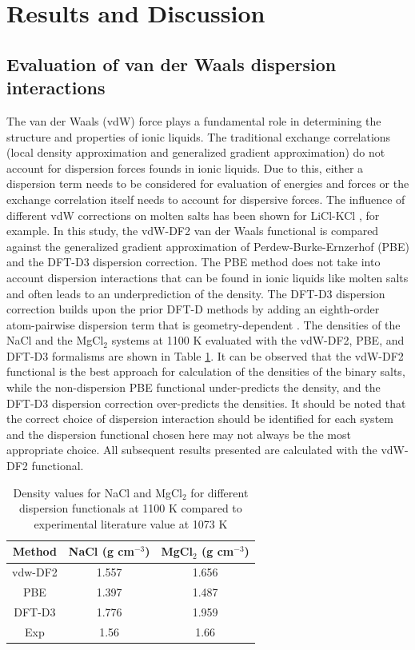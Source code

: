 \documentclass[review]{elsarticle}
\begin{document}
\section{Results and Discussion}

\subsection{Evaluation of van der Waals dispersion interactions}

The van der Waals (vdW) force plays a fundamental role in determining the structure and properties of ionic liquids. The traditional exchange correlations (local density approximation and generalized gradient approximation) do not account for dispersion forces founds in ionic liquids. Due to this, either a dispersion term needs to be considered for evaluation of energies and forces or the exchange correlation itself needs to account for dispersive forces. The influence of different vdW corrections on molten salts has been shown for LiCl-KCl \cite{Duemmler2021}, for example. In this study, the vdW-DF2 van der Waals functional \cite{Dion2004} is compared against the generalized gradient approximation of Perdew-Burke-Ernzerhof (PBE) \cite{PBE1996} and the DFT-D3 \cite{grimm2010} dispersion correction. The PBE method does not take into account dispersion interactions that can be found in ionic liquids like molten salts and often leads to an underprediction of the density. The DFT-D3 dispersion correction builds upon the prior DFT-D methods by adding an eighth-order atom-pairwise dispersion term that is geometry-dependent \cite{grimm2010}. The densities of the NaCl and the MgCl$_2$ systems at 1100 K evaluated with the vdW-DF2, PBE, and DFT-D3 formalisms are shown in Table \ref{table:functional}. It can be observed that the vdW-DF2 functional is the best approach for calculation of the densities of the binary salts, while the non-dispersion PBE functional under-predicts the density, and the DFT-D3 dispersion correction over-predicts the densities. It should be noted that the correct choice of dispersion interaction should be identified for each system and the dispersion functional chosen here may not always be the most appropriate choice. All subsequent results presented are calculated with the vdW-DF2 functional.
\begin{table}[h]
\centering
\caption{Density values for NaCl and MgCl$_2$ for different dispersion functionals at 1100 K compared to experimental literature value at 1073 K \cite{grjotheim1971} }
\begin{tabular}{|c|c|c|}
\hline
Method & NaCl (g cm$^{-3}$) & MgCl$_2$ (g cm$^{-3}$) \\
\hline

vdw-DF2	& 1.557       & 1.656\\
PBE	  & 1.397	      & 1.487\\
DFT-D3	& 1.776	      & 1.959\\
Exp	  & 1.56	      & 1.66\\

\hline
\end{tabular}
\label{table:functional}
\end{table}
\end{document}
